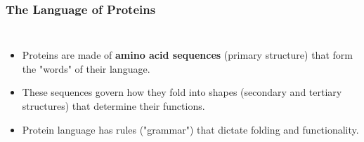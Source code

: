 \usetikzlibrary{calc}
\usetikzlibrary{positioning}
\usetikzlibrary{fit}

\begin{frame}
    \frametitle{The Language of Proteins}

    \begin{columns}
        \begin{itemize}
            \item <1-> Proteins are made of \textbf{amino acid sequences} (primary structure) that form the "words" of their language.
            \item <2-> These sequences govern how they fold into shapes (secondary and tertiary structures) that determine their functions.
            \item <3-> Protein language has rules ("grammar") that dictate folding and functionality.
        \end{itemize}


\end{columns}
\end{frame}
